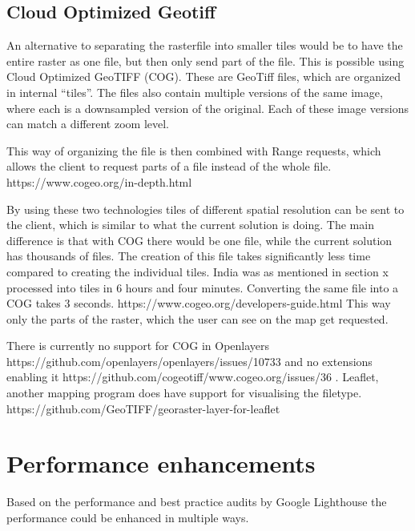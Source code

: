 
\subsection{Cloud Optimized Geotiff}

An alternative to separating the rasterfile into smaller tiles would be to have the entire raster as one file, but then only send part of the file. This is possible using Cloud Optimized GeoTIFF (COG). These are GeoTiff files, which are organized in internal “tiles”.
The files also contain multiple versions of the same image, where each is a downsampled version of the original. Each of these image versions can match a different zoom level.


This way of organizing the file is then combined with Range requests, which allows the client to request parts of a file instead of the whole file.
https://www.cogeo.org/in-depth.html

By using these two technologies tiles of different spatial resolution can be sent to the client, which is similar to what the current solution is doing. The main difference is that with COG there would be one file, while the current solution has thousands of files. The creation of this file takes significantly less time compared to creating the individual tiles. India was as mentioned in section x processed into tiles in 6 hours and four minutes. Converting the same file into a COG takes 3 seconds.
https://www.cogeo.org/developers-guide.html
This way only the parts of the raster, which the user can see on the map get requested.


There is currently no support for COG in Openlayers
https://github.com/openlayers/openlayers/issues/10733
and no extensions enabling it
https://github.com/cogeotiff/www.cogeo.org/issues/36
. Leaflet, another mapping program does have support for visualising the filetype.
https://github.com/GeoTIFF/georaster-layer-for-leaflet


\section{Performance enhancements}

Based on the performance and best practice audits by Google Lighthouse the performance could be enhanced in multiple ways. 

